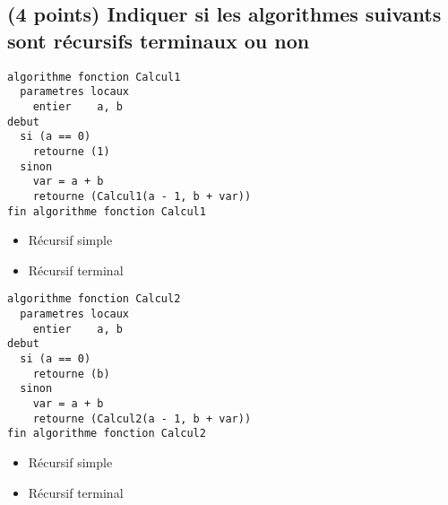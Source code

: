 \documentclass[11pt,a4paper]{article}
\begin{document}
\MakeExamTitle                   %




\renewcommand{\thesubsection}{\arabic{subsection}} %




\subsection{(4 points) Indiquer si les algorithmes suivants sont récursifs terminaux ou non }

\begin{table}[htb!]
  \centering
  \begin{minipage}{0.50\textwidth}
    \centering
  \begin{lstlisting}[style=algorithmique]
algorithme fonction Calcul1
  parametres locaux
    entier    a, b
debut
  si (a == 0)
    retourne (1)
  sinon
    var = a + b
    retourne (Calcul1(a - 1, b + var))
fin algorithme fonction Calcul1
  \end{lstlisting}

  \begin{itemize}
    \item[\CaseCoche] Récursif simple \\
    \item[\checkmark] Récursif terminal \\ %
  \end{itemize}

  \end{minipage}
  \hfillx
  \begin{minipage}{0.5\textwidth}
    \centering
  \begin{lstlisting}[style=algorithmique]
algorithme fonction Calcul2
  parametres locaux
    entier    a, b
debut
  si (a == 0)
    retourne (b)
  sinon
    var = a + b
    retourne (Calcul2(a - 1, b + var))
fin algorithme fonction Calcul2
  \end{lstlisting}

  \begin{itemize}
    \item[\CaseCoche] Récursif simple \\
    \item[\checkmark] Récursif terminal \\ %
  \end{itemize}

  \end{minipage}
\end{table}
\end{document}

